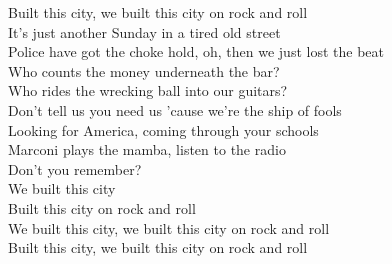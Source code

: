 Built this city, we built this city on rock and roll\\
It's just another Sunday in a tired old street\\
Police have got the choke hold, oh, then we just lost the beat\\
Who counts the money underneath the bar?\\
Who rides the wrecking ball into our guitars?\\
Don't tell us you need us 'cause we're the ship of fools\\
Looking for America, coming through your schools\\
 Marconi plays the mamba, listen to the radio \\
Don't you remember? \\
We built this city  \\
Built this city on rock and  roll \\
We built this city, we built this city on rock and roll\\
Built this city, we built this city on rock and roll\\

